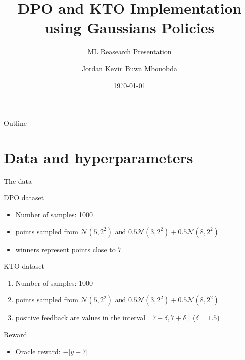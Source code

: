 \documentclass{beamer}
\title[DPO \& KTO Implementation]{DPO and KTO Implementation using Gaussians Policies}
\subtitle{ML Reasearch Presentation}
\author[Jordan Buwa]{Jordan Kevin Buwa Mbouobda}
\institute{MI Research}
\date{\today}
\begin{document}
{
\begin{frame}
    \titlepage
\end{frame}
}

\begin{frame}{Outline}
    \tableofcontents
\end{frame}

\section{Data and hyperparameters}

\begin{frame}{The data}
    \begin{block}{DPO dataset}
        \begin{itemize}
            \item Number of samples: 1000
            \item points sampled from \(\mathcal{N}(5, 2^2)\) and \(0.5\mathcal{N}(3, 2^2) + 0.5\mathcal{N}(8, 2^2)\)
            \item winners represent points close to \(7\)
        \end{itemize}
    \end{block}

    \vspace{0.3cm}

    \begin{block}{KTO dataset}
        \begin{enumerate}
            \item Number of samples: 1000
            \item points sampled from \(\mathcal{N}(5, 2^2)\) and \(0.5\mathcal{N}(3, 2^2) + 0.5\mathcal{N}(8, 2^2)\)
            \item positive feedback are values in the interval \([7 - \delta, 7 + \delta]\) (\(\delta = 1.5\))
        \end{enumerate}
    \end{block}

    \begin{block}{Reward}
        \begin{itemize}
            \item Oracle reward: \(-|y-7|\)
        \end{itemize}
    \end{block}
\end{frame}
\end{document}

